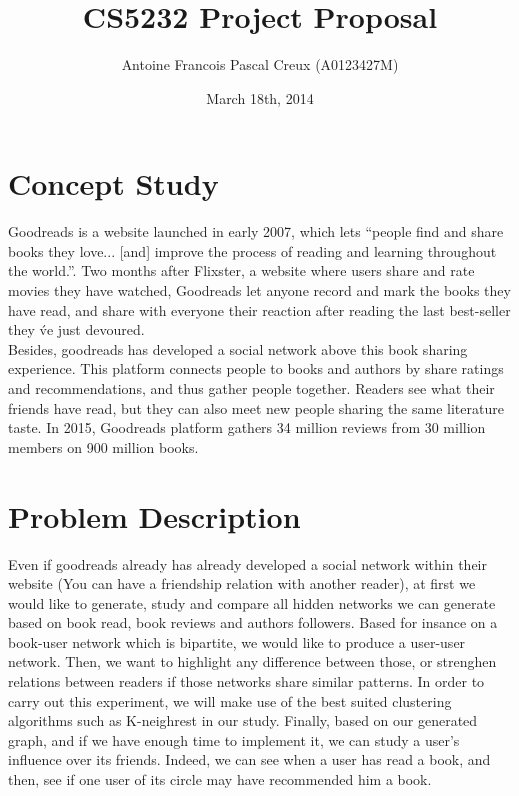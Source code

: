 \documentclass[11pt]{article}
\title{\textbf{CS5232 Project Proposal\\} }
\author{Antoine Francois Pascal Creux (A0123427M)}
\date{March 18th, 2014}
\begin{document}
    \maketitle


\section{Concept Study}


Goodreads is a website launched in early 2007, which lets ``people find and share books they love... [and] improve the process of reading and learning throughout the world.''\cite{goodreads:aboutus}. Two months after Flixster\cite{flixter}, a website where users share and rate movies they have watched, Goodreads let anyone record and mark the books they have read, and share with everyone their reaction after reading the last best-seller they \'ve just devoured.\\
Besides, goodreads has developed a social network above this book sharing experience. This platform connects people to books and authors by share ratings and recommendations, and thus gather people together. Readers see what their friends have read, but they can also meet new people sharing the same literature taste. In 2015, Goodreads platform gathers 34 million reviews from 30 million members on 900 million books\cite{goodreads:aboutus}.



\section{Problem Description}


Even if goodreads already has already developed a social network within their website (You can have a friendship relation with another reader), at first we would like to generate, study and compare all hidden networks we can generate based on book read, book reviews and authors followers. Based for insance on a book-user network which is bipartite, we would like to produce a user-user network. Then, we want to highlight any difference between those, or strenghen relations between readers if those networks share similar patterns. In order to carry out this experiment, we will make use of the best suited clustering algorithms such as K-neighrest in our study.
Finally, based on our generated graph, and if we have enough time to implement it, we can study a user's influence over its friends. Indeed, we can see when a user has read a book, and then, see if one user of its circle may have recommended him a book.
\end{document}
